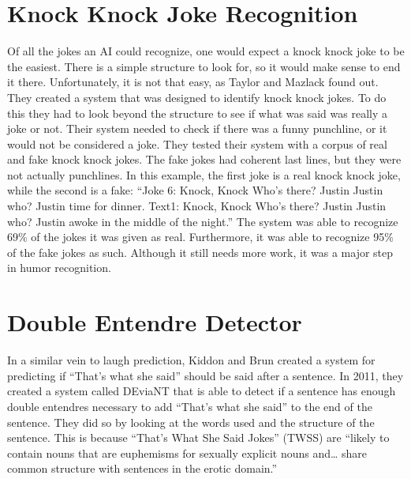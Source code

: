 \section {Knock Knock Joke Recognition}
Of all the jokes an AI could recognize, one would expect a knock knock joke to be the easiest. There is a simple structure to look for, so it would make sense to end it there. Unfortunately, it is not that easy, as Taylor and Mazlack found out. They created a system that was designed to identify knock knock jokes. \cite{knockknock} To do this they had to look beyond the structure to see if what was said was really a joke or not. Their system needed to check if there was a funny punchline, or it would not be considered a joke. They tested their system with a corpus of real and fake knock knock jokes. The fake jokes had coherent last lines, but they were not actually punchlines. In this example, the first joke is a real knock knock joke, while the second is a fake:\newline\newline
``Joke 6: Knock, Knock \newline
Who's there?\newline
Justin\newline
Justin who?\newline
Justin time for dinner.\newline\newline
Text1: Knock, Knock\newline
Who's there?\newline
Justin\newline
Justin who?\newline
Justin awoke in the middle of the night.'' \cite{knockknock}\newline\newline
The system was able to recognize 69\% of the jokes it was given as real. Furthermore, it was able to recognize 95\% of the fake jokes as such. Although it still needs more work, it was a major step in humor recognition.

\section{Double Entendre Detector}
In a similar vein to laugh prediction, Kiddon and Brun created a system for predicting if ``That's what she said'' should be said after a sentence. In 2011, they created a system called DEviaNT that is able to detect if a sentence has enough double entendres necessary to add ``That's what she said'' to the end of the sentence. They did so by looking at the words used and the structure of the sentence. This is because ``That's What She Said Jokes'' (TWSS) are ``likely to contain nouns that are euphemisms for sexually explicit nouns and… share common structure with sentences in the erotic domain.'' \cite{twss}

